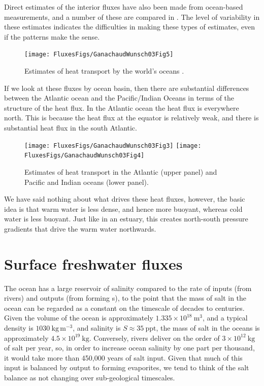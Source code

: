Direct estimates of the interior fluxes have also been made from ocean-based measurements, and a number of these are compared in .  The level of variability in these estimates indicates the difficulties in making these types of estimates, even if the patterns make the sense.  

\begin{figure}
\begin{center}
\texttt{[image: FluxesFigs/GanachaudWunsch03Fig5]}
 \caption{Estimates of heat transport by the world's oceans \citep{ganachaudwunsch03}.}
  \label{fig:GanachaudWunsch03Fig5}
\end{center}
\end{figure}

If we look at these fluxes by ocean basin, then there are substantial differences between the Atlantic ocean and the Pacific/Indian Oceans in terms of the structure of the heat flux.  In the Atlantic ocean the heat flux is everywhere north.  This is because the heat flux at the equator is relatively weak, and there is substantial heat flux in the south Atlantic.  


\begin{figure}
\begin{center}
\texttt{[image: FluxesFigs/GanachaudWunsch03Fig3]}
\texttt{[image: FluxesFigs/GanachaudWunsch03Fig4]}
 \caption{Estimates of heat transport in the Atlantic (upper panel) and Pacific and Indian oceans (lower panel)\citep{ganachaudwunsch03}.}
  \label{fig:GanachaudWunsch03Fig3_4}
\end{center}
\end{figure}

We have said nothing about what drives these heat fluxes, however, the basic idea is that warm water is less dense, and hence more buoyant, whereas cold water is less buoyant.  Just like in an estuary, this creates north-south pressure gradients that drive the warm water northwards.  


\section{Surface freshwater fluxes}

The ocean has a large reservoir of salinity compared to the rate of inputs (from rivers) and outputs (from forming s), to the point that the mass of salt in the ocean can be regarded as a constant on the timescale of decades to centuries.  Given the volume of the ocean is approximately $1.335\times10^{18}\ \mathrm{m^3}$, and a typical density is $1030\ \mathrm{kg\,m^{-3}}$, and salinity is $S\approx35 \ \mathrm{ppt}$, the mass of salt in the oceans is approximately $4.5\times10^{19} \ \mathrm{kg}$.  Conversely, rivers deliver on the order of  $3\times10^{12} \ \mathrm{kg}$ of salt per year, so, in order to increase ocean salinity by one part per thousand, it would take more than 450,000 years of salt input.  Given that much of this input is balanced by output to forming evaporites, we tend to think of the salt balance as not changing over sub-geological timescales.  

